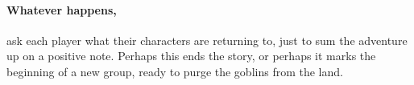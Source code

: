 \begin{multicols}{2}
{  \paragraph{Whatever happens,}
  ask each player what their characters are returning to, just to sum the adventure up on a positive note.
  Perhaps this ends the story, or perhaps it marks the beginning of a new group, ready to purge the goblins from the land.
}


\end{multicols}

